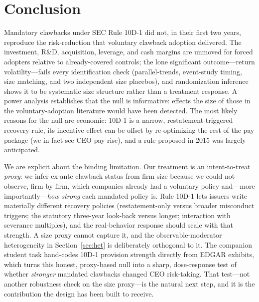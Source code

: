 \documentclass[12pt]{article}
\begin{document}
\section{Conclusion}\label{sec:concl}
Mandatory clawbacks under SEC Rule 10D-1 did not, in their first two years, reproduce the
risk-reduction that voluntary clawback adoption delivered. The investment, R\&D, acquisition,
leverage, and cash margins are unmoved for forced adopters relative to already-covered controls;
the lone significant outcome---return volatility---fails every identification check
(parallel-trends, event-study timing, size matching, and two independent size placebos), and
randomization inference shows it to be systematic size structure rather than a treatment
response. A power analysis establishes that the null is informative: effects the size of those
in the voluntary-adoption literature would have been detected. The most likely reasons for the
null are economic: 10D-1 is a narrow, restatement-triggered recovery rule, its incentive effect
can be offset by re-optimizing the rest of the pay package (we in fact see CEO pay rise), and a
rule proposed in 2015 was largely anticipated.

We are explicit about the binding limitation. Our treatment is an intent-to-treat \emph{proxy}:
we infer ex-ante clawback status from firm size because we could not observe, firm by firm,
which companies already had a voluntary policy and---more importantly---\emph{how strong} each
mandated policy is. Rule 10D-1 lets issuers write materially different recovery policies
(restatement-only versus broader misconduct triggers; the statutory three-year look-back versus
longer; interaction with severance multiples), and the real-behavior response should scale with
that strength. A size proxy cannot capture it, and the observable-moderator heterogeneity in
Section~\ref{sec:het} is deliberately orthogonal to it. The companion student task hand-codes
10D-1 provision strength directly from EDGAR exhibits, which turns this honest, proxy-based null
into a sharp, dose-response test of whether \emph{stronger} mandated clawbacks changed CEO
risk-taking. That test---not another robustness check on the size proxy---is the natural next
step, and it is the contribution the design has been built to receive.
\end{document}
